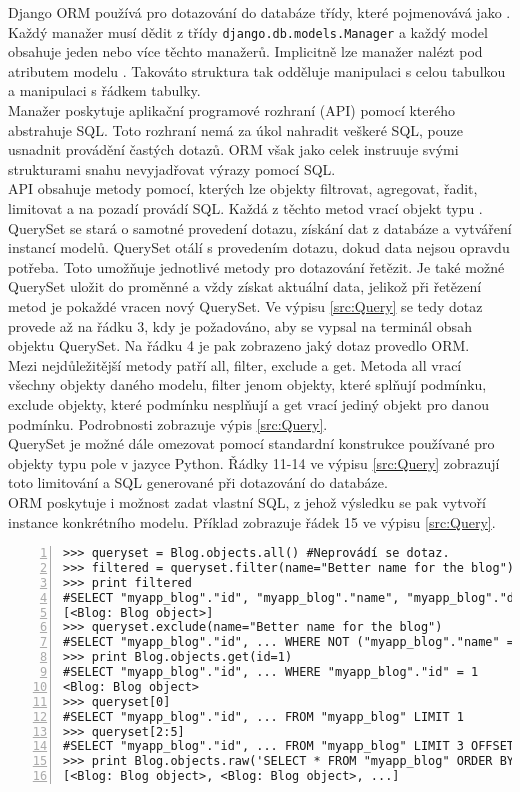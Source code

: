 \documentclass[ing,male,java,dept456]{diploma}						%
\begin{document}
Django ORM používá pro dotazování do databáze třídy, které pojmenovává jako . Každý manažer musí dědit z třídy \lstinline[style=custompython]|django.db.models.Manager| a každý model obsahuje jeden nebo více těchto manažerů. Implicitně lze manažer nalézt pod atributem modelu . Takováto struktura tak odděluje manipulaci s celou tabulkou a manipulaci s řádkem tabulky. \\
Manažer poskytuje aplikační programové rozhraní (API) pomocí kterého abstrahuje SQL. Toto rozhraní nemá za úkol nahradit veškeré SQL, pouze usnadnit provádění častých dotazů. ORM však jako celek instruuje svými strukturami snahu nevyjadřovat výrazy pomocí SQL. \\
API obsahuje metody pomocí, kterých lze objekty filtrovat, agregovat, řadit, limitovat a na pozadí provádí SQL. Každá z těchto metod vrací objekt typu . QuerySet se stará o samotné provedení dotazu, získání dat z databáze a vytváření instancí modelů. QuerySet otálí s provedením dotazu, dokud data nejsou opravdu potřeba. Toto umožňuje jednotlivé metody pro dotazování řetězit. Je také možné QuerySet uložit do proměnné a vždy získat aktuální data, jelikož při řetězení metod je pokaždé vracen nový QuerySet. Ve výpisu \ref{src:Query} se tedy dotaz provede až na řádku 3, kdy je požadováno, aby se vypsal na terminál obsah objektu QuerySet. Na řádku 4 je pak zobrazeno jaký dotaz provedlo ORM. \\
Mezi nejdůležitější metody patří all, filter, exclude a get. Metoda all vrací všechny objekty daného modelu, filter jenom objekty, které splňují podmínku, exclude objekty, které podmínku nesplňují a get vrací jediný objekt pro danou podmínku. Podrobnosti zobrazuje výpis \ref{src:Query}. \\
QuerySet je možné dále omezovat pomocí standardní konstrukce používané pro objekty typu pole v jazyce Python. Řádky 11-14 ve výpisu \ref{src:Query} zobrazují toto limitování a SQL generované při dotazování do databáze. \\
ORM poskytuje i možnost zadat vlastní SQL, z jehož výsledku se pak vytvoří instance konkrétního modelu. Příklad zobrazuje řádek 15 ve výpisu \ref{src:Query}.

\begin{lstlisting}[style=custompython, numbers=left, label=src:Query, caption={Ukázka získávání dat z databáze}]
>>> queryset = Blog.objects.all() #Neprovádí se dotaz.
>>> filtered = queryset.filter(name="Better name for the blog")
>>> print filtered
#SELECT "myapp_blog"."id", "myapp_blog"."name", "myapp_blog"."description" FROM "myapp_blog" WHERE "myapp_blog"."name" = \'Better name for the blog\'
[<Blog: Blog object>] 
>>> queryset.exclude(name="Better name for the blog")
#SELECT "myapp_blog"."id", ... WHERE NOT ("myapp_blog"."name" = \'Better name\' )
>>> print Blog.objects.get(id=1)
#SELECT "myapp_blog"."id", ... WHERE "myapp_blog"."id" = 1
<Blog: Blog object>
>>> queryset[0]
#SELECT "myapp_blog"."id", ... FROM "myapp_blog" LIMIT 1
>>> queryset[2:5]
#SELECT "myapp_blog"."id", ... FROM "myapp_blog" LIMIT 3 OFFSET 2
>>> print Blog.objects.raw('SELECT * FROM "myapp_blog" ORDER BY "myapp_blog"."name"')
[<Blog: Blog object>, <Blog: Blog object>, ...] 
\end{lstlisting}
\end{document}
